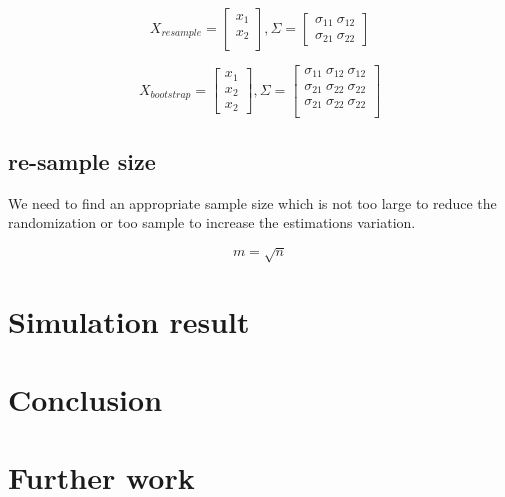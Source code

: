 \documentclass[]{article}
\begin{document}
\[
  X_{resample} = \begin{bmatrix}   
        x_1\\
        x_2\\
      \end{bmatrix},
  \Sigma = \begin{bmatrix}   
        \sigma_{11} ~ \sigma_{12}\\
        \sigma_{21} ~ \sigma_{22}
      \end{bmatrix}
\]

\[
  X_{bootstrap} = \begin{bmatrix}   
        x_1\\
        x_2\\
        x_2
      \end{bmatrix},
  \Sigma = \begin{bmatrix}   
        \sigma_{11} ~ \sigma_{12} ~ \sigma_{12}\\
        \sigma_{21} ~ \sigma_{22} ~ \sigma_{22}\\
        \sigma_{21} ~ \sigma_{22} ~ \sigma_{22}\\
      \end{bmatrix}
\]

\subsection{re-sample size}\label{re-sample-size}

We need to find an appropriate sample size which is not too large to
reduce the randomization or too sample to increase the estimations
variation.

\[
  m = \sqrt{n}
\]

\section{Simulation result}\label{simulation-result}

\section{Conclusion}\label{conclusion}

\section{Further work}\label{further-work}
\end{document}
